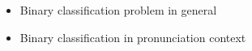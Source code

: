\begin{itemize}
	\item Binary classification problem in general
	\item Binary classification in pronunciation context
\end{itemize}